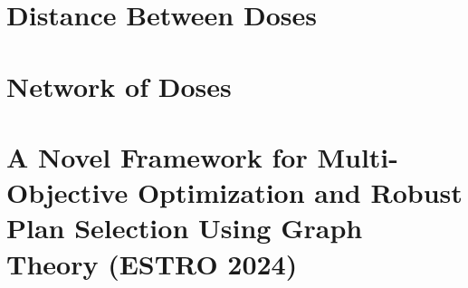 \section{Distance Between Doses}

\section{Network of Doses}

\section[Novel Dosimetry Automation Approach with Graph Theory]{A Novel Framework for Multi-Objective Optimization and Robust Plan Selection Using Graph Theory (ESTRO 2024)}

